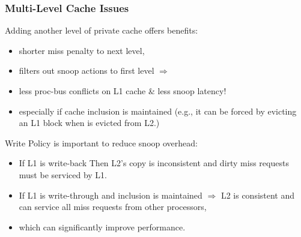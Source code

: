 \documentclass{beamer}
\renewcommand{\emph}[1]{\textcolor{structure}{#1}}
\begin{document}
\begin{frame}[fragile,t]
\frametitle{Multi-Level Cache Issues}

Adding another level of private cache offers benefits:
\begin{itemize} 
    \item shorter miss penalty to next level,
    \item filters out snoop actions to first level $\Rightarrow$
    \item \emph{less proc-bus conflicts on L1 cache \& less snoop latency!}
    \item especially if cache inclusion is maintained
            (e.g., it can be forced by evicting an L1 
            block when is evicted from L2.)
\end{itemize} 
\bigskip

Write Policy is important to reduce snoop overhead:
\begin{itemize}
    \item If L1 is write-back Then L2's copy is inconsistent and
            dirty miss requests must be serviced by L1.
    \item \emph{If L1 is write-through and inclusion is maintained $\Rightarrow$
                L2 is consistent and can service all miss requests from
                other processors,}
    \item which can significantly improve performance.
\end{itemize}

\end{frame}

\end{document}
